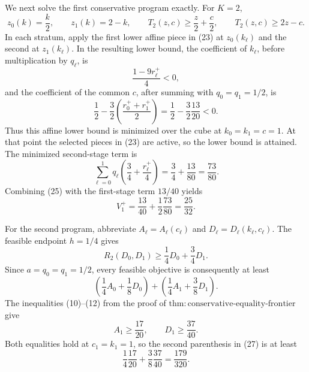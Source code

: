 We next solve the first conservative program exactly.  For \(K=2\),
\[
 z_0(k)=\frac{k}{2},\qquad z_1(k)=2-k,
 \qquad
 T_2(z,c)\geq\frac z2+\frac c2,
 \qquad T_2(z,c)\geq2z-c.                                    \tag{23}
\]
In each stratum, apply the first lower affine piece in (23) at
\(z_0(k_\ell)\) and the second at \(z_1(k_\ell)\).  In the resulting
lower bound, the coefficient of \(k_\ell\), before multiplication by
\(q_\ell\), is
\[
 \frac{1-9r_\ell^+}{4}<0,
\]
and the coefficient of the common \(c\), after summing with
\(q_0=q_1=1/2\), is
\[
 \frac12-\frac32\left(\frac{r_0^++r_1^+}{2}\right)
 =\frac12-\frac32\frac{13}{20}<0.                              \tag{24}
\]
Thus this affine lower bound is minimized over the cube at
\(k_0=k_1=c=1\).  At that point the selected pieces in (23) are active,
so the lower bound is attained.  The minimized second-stage term is
\[
 \sum_{\ell=0}^1q_\ell\left(\frac34+\frac{r_\ell^+}{4}\right)
 =\frac34+\frac{13}{80}=\frac{73}{80}.                         \tag{25}
\]
Combining (25) with the first-stage term \(13/40\) yields
\[
 V_1^+=\frac{13}{40}+\frac12\frac{73}{80}=\frac{25}{32}.       \tag{26}
\]

For the second program, abbreviate
\(A_\ell=A_\ell(c_\ell)\) and
\(D_\ell=D_\ell(k_\ell,c_\ell)\).  The feasible endpoint
\(h=1/4\) gives
\[
 R_2(D_0,D_1)\geq\frac14D_0+\frac34D_1.
\]
Since \(a=q_0=q_1=1/2\), every feasible objective is consequently at
least
\[
 \left(\frac14A_0+\frac18D_0\right)
 +\left(\frac14A_1+\frac38D_1\right).                          \tag{27}
\]
The inequalities (10)--(12) from the proof of
\(\mathrm{thm{:}conservative\text{-}equality\text{-}frontier}\) give
\[
 A_1\geq\frac{17}{20},\qquad D_1\geq\frac{37}{40}.
\]
Both equalities hold at \(c_1=k_1=1\), so the second parenthesis in
(27) is at least
\[
 \frac14\frac{17}{20}+\frac38\frac{37}{40}
 =\frac{179}{320}.                                             \tag{28}
\]

